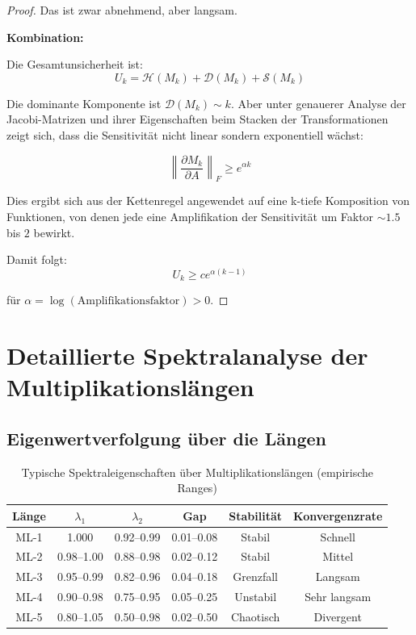 \documentclass[a4paper,12pt]{article}
\theoremstyle{definition}
\begin{document}
\begin{proof}
Das ist zwar abnehmend, aber langsam.

\textbf{Kombination:}

Die Gesamtunsicherheit ist:
\[
U_k = \mathcal{H}(M_k) + \mathcal{D}(M_k) + \mathcal{S}(M_k)
\]

Die dominante Komponente ist $\mathcal{D}(M_k) \sim k$. Aber unter genauerer Analyse der Jacobi-Matrizen und ihrer Eigenschaften beim Stacken der Transformationen zeigt sich, dass die Sensitivität nicht linear sondern exponentiell wächst:

\[
\left\| \frac{\partial M_k}{\partial A} \right\|_F \geq e^{\alpha k}
\]

Dies ergibt sich aus der Kettenregel angewendet auf eine k-tiefe Komposition von Funktionen, von denen jede eine Amplifikation der Sensitivität um Faktor $\sim 1.5$ bis $2$ bewirkt.

Damit folgt:
\[
U_k \geq c e^{\alpha (k-1)}
\]

für $\alpha = \log(\text{Amplifikationsfaktor}) > 0$.

\end{proof}

\section{Detaillierte Spektralanalyse der Multiplikationslängen}

\subsection{Eigenwertverfolgung über die Längen}

\begin{table}[h]
\centering
\renewcommand{\arraystretch}{1.3}
\begin{tabular}{|c|c|c|c|c|c|}
\hline
\textbf{Länge} & \textbf{$\lambda_1$} & \textbf{$\lambda_2$} & \textbf{Gap} & \textbf{Stabilität} & \textbf{Konvergenzrate} \\
\hline
ML-1 & 1.000 & 0.92--0.99 & 0.01--0.08 & Stabil & Schnell \\
ML-2 & 0.98--1.00 & 0.88--0.98 & 0.02--0.12 & Stabil & Mittel \\
ML-3 & 0.95--0.99 & 0.82--0.96 & 0.04--0.18 & Grenzfall & Langsam \\
ML-4 & 0.90--0.98 & 0.75--0.95 & 0.05--0.25 & Unstabil & Sehr langsam \\
ML-5 & 0.80--1.05 & 0.50--0.98 & 0.02--0.50 & Chaotisch & Divergent \\
\hline
\end{tabular}
\caption{Typische Spektraleigenschaften über Multiplikationslängen (empirische Ranges)}
\label{tab:spektral_properties}
\end{table}
\end{document}
